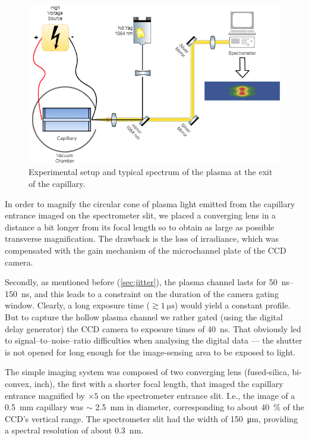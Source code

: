 \documentclass[../main.tex]{subfiles}
\begin{document}
\begin{figure}
\centering
\includegraphics[width=\textwidth]{./figures/spectro/radial_system.png}
\caption{Experimental setup and typical spectrum of the plasma at the exit of the capillary.}
\label{fig:radial_system}
\end{figure}

In order to magnify the circular cone of plasma light emitted from the capillary entrance imaged on the spectrometer slit, we placed a converging lens in a distance a bit longer from its focal length so to obtain as large as possible transverse magnification. The drawback is the loss of irradiance, which was compensated with the gain mechanism of the microchannel plate of the CCD camera.

Secondly, as mentioned before (\ref{sec:jitter}), the plasma channel lasts for \SIrange{50}{150}{\ns}, and this leads to a constraint on the duration of the camera gating window. Clearly, a long exposure time ($\gtrsim \SI{1}{\us}$) would yield a constant profile. But to capture the hollow plasma channel we rather gated (using the digital delay generator) the CCD camera to exposure times of \SI{40}{\ns}. That obviously led to signal--to--noise--ratio difficulties when analysing the digital data --- the shutter is not opened for long enough for the image-sensing area to be exposed to light.

The simple imaging system was composed of two converging lens (fused-silica, bi-convex,  inch), the first with a shorter focal length, that imaged the capillary entrance magnified by $\times 5$ on the spectrometer entrance slit. I.e., the image of a \SI{0.5}{\mm} capillary was $\sim$ \SI{2.5}{\mm} in diameter, corresponding to about \SI{40}{\percent} of the CCD's vertical range. The spectrometer slit had the width of \SI{150}{\micro\metre}, providing a spectral resolution of about \SI{0.3}{\nm}.
\end{document}
